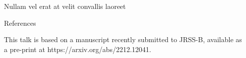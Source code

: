 \documentclass[final]{beamer}
\newlength{\sepwidth}
\newlength{\colwidth}
\newcommand{\separatorcolumn}{\begin{column}{\sepwidth}\end{column}}
\begin{document}
\begin{frame}[t]
\begin{columns}[t]
\begin{column}{\colwidth}
\begin{block}{Nullam vel erat at velit convallis laoreet}
  \end{block}

  \begin{block}{References}

    This talk is based on a manuscript recently submitted to JRSS-B, available as a pre-print at https://arxiv.org/abs/2212.12041.

    \nocite{*}
    \footnotesize{}

  \end{block}

\end{column}

\separatorcolumn
\end{columns}
\end{frame}
\end{document}
